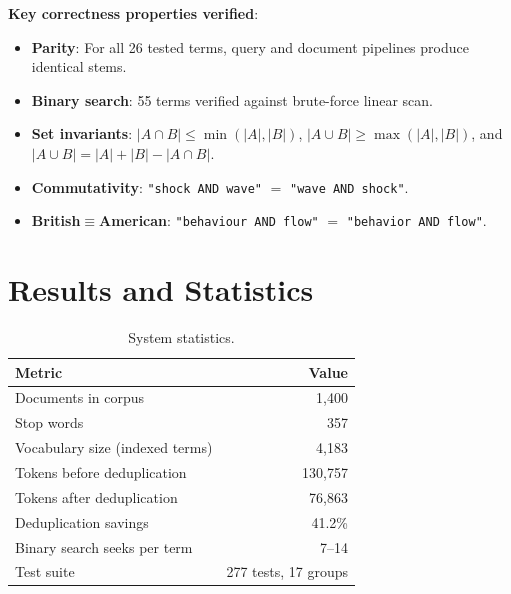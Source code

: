 \documentclass[12pt,a4paper]{article}
\begin{document}
\textbf{Key correctness properties verified}:
\begin{itemize}[noitemsep]
  \item \textbf{Parity}: For all 26 tested terms, query and document pipelines produce identical stems.
  \item \textbf{Binary search}: 55 terms verified against brute-force linear scan.
  \item \textbf{Set invariants}: $|A \cap B| \leq \min(|A|,|B|)$,
        $|A \cup B| \geq \max(|A|,|B|)$, and $|A \cup B| = |A| + |B| - |A \cap B|$.
  \item \textbf{Commutativity}: \texttt{"shock AND wave"} $=$ \texttt{"wave AND shock"}.
  \item \textbf{British$\equiv$American}: \texttt{"behaviour AND flow"} $=$ \texttt{"behavior AND flow"}.
\end{itemize}

\section{Results and Statistics}
\label{sec:results}

\begin{table}[H]
\centering\small
\caption{System statistics.}
\begin{tabular}{@{}l r@{}}
\toprule
\textbf{Metric} & \textbf{Value} \\
\midrule
Documents in corpus & 1,400 \\
Stop words & 357 \\
Vocabulary size (indexed terms) & 4,183 \\
Tokens before deduplication & 130,757 \\
Tokens after deduplication & 76,863 \\
Deduplication savings & 41.2\% \\
Binary search seeks per term & 7--14 \\
Test suite & 277 tests, 17 groups \\
\bottomrule
\end{tabular}
\end{table}
\end{document}
